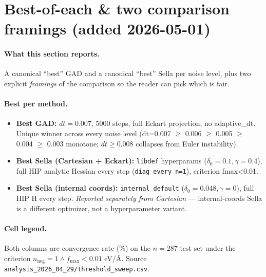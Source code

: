 \documentclass[11pt]{article}
\begin{document}
\section{Best-of-each \& two comparison framings (added 2026-05-01)}

\paragraph{What this section reports.} A canonical ``best'' GAD and a
canonical ``best'' Sella per noise level, plus two explicit
\emph{framings} of the comparison so the reader can pick which is fair.

\paragraph{Best per method.}
\begin{itemize}[leftmargin=1.5em]
\item \textbf{Best GAD:} $dt=0.007$, 5000 steps, full Eckart projection,
  no adaptive\_dt. Unique winner across every noise level
  (dt=0.007 $\geq$ 0.006 $\geq$ 0.005 $\geq$ 0.004 $\geq$ 0.003 monotone;
  $dt\geq 0.008$ collapses from Euler instability).
\item \textbf{Best Sella (Cartesian + Eckart):} \texttt{libdef} hyperparams
  ($\delta_0{=}0.1, \gamma{=}0.4$), full HIP analytic Hessian every
  step (\texttt{diag\_every\_n=1}), criterion fmax<0.01.
\item \textbf{Best Sella (internal coords):} \texttt{internal\_default}
  ($\delta_0{=}0.048, \gamma{=}0$), full HIP H every step. \emph{Reported
  separately from Cartesian} — internal-coords Sella is a different
  optimizer, not a hyperparameter variant.
\end{itemize}

\paragraph{Cell legend.} Both columns are convergence rate (\%) on the
$n=287$ test set under the criterion $n_{\text{neg}}{=}1 \wedge f_{\max}{<}0.01$
eV/{\AA}. Source \texttt{analysis\_2026\_04\_29/threshold\_sweep.csv}.
\end{document}

